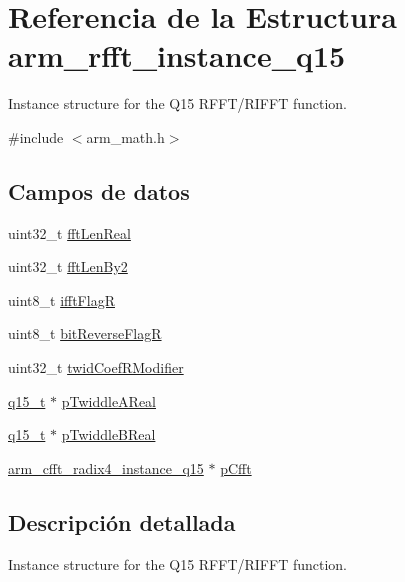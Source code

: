 \hypertarget{structarm__rfft__instance__q15}{}\section{Referencia de la Estructura arm\+\_\+rfft\+\_\+instance\+\_\+q15}
\label{structarm__rfft__instance__q15}


Instance structure for the Q15 R\+F\+F\+T/\+R\+I\+F\+FT function.  




{\ttfamily \#include $<$arm\+\_\+math.\+h$>$}

\subsection*{Campos de datos}
\begin{DoxyCompactItemize}
\item 
uint32\+\_\+t \hyperlink{structarm__rfft__instance__q15_adf0d4604cf5546075d9d4cf122d6c986}{fft\+Len\+Real}
\item 
uint32\+\_\+t \hyperlink{structarm__rfft__instance__q15_ae7db13e0e2999656d98c4223de5b1284}{fft\+Len\+By2}
\item 
uint8\+\_\+t \hyperlink{structarm__rfft__instance__q15_a787d72055c89e4d62b188d6bd646341c}{ifft\+FlagR}
\item 
uint8\+\_\+t \hyperlink{structarm__rfft__instance__q15_ad56ec2425e2422108b8767b43d944591}{bit\+Reverse\+FlagR}
\item 
uint32\+\_\+t \hyperlink{structarm__rfft__instance__q15_a5b06f7f76c018db993fe6acc5708c589}{twid\+Coef\+R\+Modifier}
\item 
\hyperlink{arm__math_8h_ab5a8fb21a5b3b983d5f54f31614052ea}{q15\+\_\+t} $\ast$ \hyperlink{structarm__rfft__instance__q15_ac17beaa033ab1ea242d49037276b67e2}{p\+Twiddle\+A\+Real}
\item 
\hyperlink{arm__math_8h_ab5a8fb21a5b3b983d5f54f31614052ea}{q15\+\_\+t} $\ast$ \hyperlink{structarm__rfft__instance__q15_a67a618de57c3a7420ee05fda1a80bf3a}{p\+Twiddle\+B\+Real}
\item 
\hyperlink{structarm__cfft__radix4__instance__q15}{arm\+\_\+cfft\+\_\+radix4\+\_\+instance\+\_\+q15} $\ast$ \hyperlink{structarm__rfft__instance__q15_ae0ac7c3a89699793fc0dac960db7f056}{p\+Cfft}
\end{DoxyCompactItemize}


\subsection{Descripción detallada}
Instance structure for the Q15 R\+F\+F\+T/\+R\+I\+F\+FT function. 

